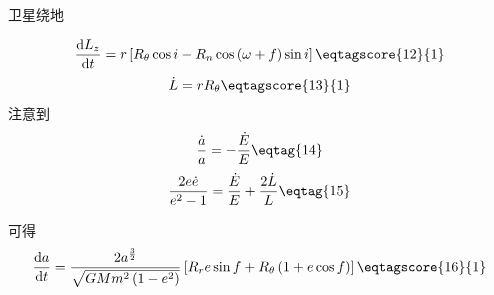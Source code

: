 \documentclass[answer]{cphos}
\begin{document}
\begin{problem}[50]{卫星绕地}
\begin{solution}
\begin{equation}
	\frac{\mathrm{d}L_z}{\mathrm{d}t} = r\left[R_\theta \cos i - R_n \cos\left(\omega + f\right) \sin i\right] \eqtagscore{12}{1}
\end{equation}
\begin{equation}
	\dot{L}=rR_{\theta} \eqtagscore{13}{1}
\end{equation}
注意到
\begin{equation}
	\frac{\dot{a}}{a}=-\frac{\dot{E}}{E} \eqtag{14}
\end{equation}
\begin{equation}
	\frac{2e\dot{e}}{e^2-1}=\frac{\dot{E}}{E}+\frac{2\dot{L}}{L} \eqtag{15}
\end{equation}

可得
\begin{equation}
	\frac{\mathrm{d}a}{\mathrm{d}t} = \frac{2a^{\frac{3}{2}}}{\sqrt{GMm^2\left(1-e^2\right)}} \left[R_r e \sin f + R_\theta \left(1+e \cos f\right)\right] \eqtagscore{16}{1} \label{eq:1.1}
\end{equation}


\end{solution}
\end{problem}
\end{document}
